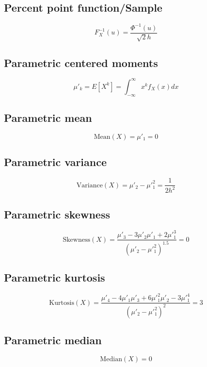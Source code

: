 \documentclass{article}
\begin{document}
\subsection{Percent point function/Sample}
\begin{equation*} F^{-1}_{X}\left(u\right)=\frac{\Phi^{-1}(u)}{\sqrt{2}h} \end{equation*}
\subsection{Parametric centered moments}
\begin{equation*} \mu'_{k}=E[X^k]=\int_{-\infty }^{\infty }x^{k}f_{X}\left(x\right)dx \end{equation*}
\subsection{Parametric mean}
\begin{equation*} \mathrm{Mean}(X)=\mu'_{1}=0 \end{equation*}
\subsection{Parametric variance}
\begin{equation*} \mathrm{Variance}(X)=\mu'_{2}-\mu'^{2}_{1}=\frac{1}{2h^{2}} \end{equation*}
\subsection{Parametric skewness}
\begin{equation*} \mathrm{Skewness}(X)=\frac{\mu'_{3}-3\mu'_{2}\mu'_{1}+2\mu'^{3}_{1}}{(\mu'_{2}-\mu'^{2}_{1})^{1.5}}=0 \end{equation*}
\subsection{Parametric kurtosis}
\begin{equation*} \mathrm{Kurtosis}(X)=\frac{\mu'_{4}-4\mu'_{1}\mu'_{3}+6\mu'^{2}_{1}\mu'_{2}-3\mu'^{4}_{1}}{(\mu'_{2}-\mu'^{2}_{1})^{2}}=3 \end{equation*}
\subsection{Parametric median}
\begin{equation*} \mathrm{Median}(X)=0 \end{equation*}
\end{document}
